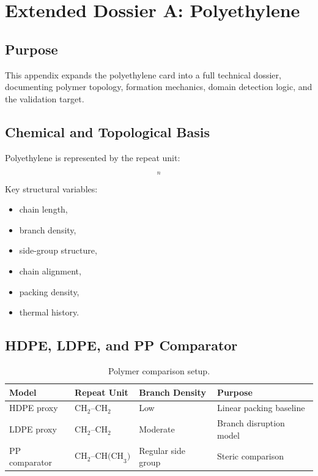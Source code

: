 \documentclass[12pt]{article}
\begin{document}
\section{Extended Dossier A: Polyethylene}
\label{app:pe}

\subsection{Purpose}

This appendix expands the polyethylene card into a full technical dossier,
documenting polymer topology, formation mechanics, domain detection logic,
and the validation target.

\subsection{Chemical and Topological Basis}

Polyethylene is represented by the repeat unit:

\begin{equation}
	[-\mathrm{CH}_2\text{--}\mathrm{CH}_2-]_n
\end{equation}

Key structural variables:

\begin{itemize}[noitemsep]
	\item chain length,
	\item branch density,
	\item side-group structure,
	\item chain alignment,
	\item packing density,
	\item thermal history.
\end{itemize}

\subsection{HDPE, LDPE, and PP Comparator}

\begin{table}[H]
\centering
\caption{Polymer comparison setup.}
\label{tab:app_pe_variants}
\begin{tabular}{llll}
\toprule
\textbf{Model} & \textbf{Repeat Unit} & \textbf{Branch Density} & \textbf{Purpose} \\
\midrule
HDPE proxy & $\mathrm{CH}_2\text{--}\mathrm{CH}_2$ & Low & Linear packing baseline \\
LDPE proxy & $\mathrm{CH}_2\text{--}\mathrm{CH}_2$ & Moderate & Branch disruption model \\
PP comparator & $\mathrm{CH}_2\text{--}\mathrm{CH(CH}_3)$ & Regular side group & Steric comparison \\
\bottomrule
\end{tabular}
\end{table}
\end{document}
